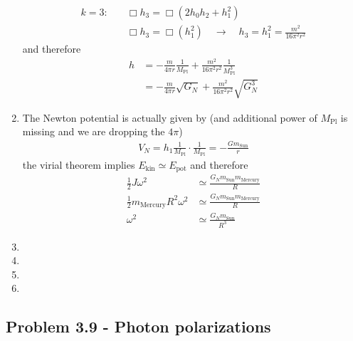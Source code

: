 \documentclass[10pt,a4paper]{book}
\theoremstyle{definition}
\begin{document}
\begin{enumerate}[label=(\alph*)]
\begin{align}
k=3:&\quad\Box h_3=\Box(2h_0h_2+h_1^2)\\
    &\quad\Box h_3=\Box(h_1^2)\quad\rightarrow\quad h_3=h_1^2=\frac{m^2}{16\pi^2r^2}
\end{align}
and therefore
\begin{align}
h&=-\frac{m}{4\pi r}\frac{1}{M_\text{Pl}}+\frac{m^2}{16\pi^2r^2}\frac{1}{M_\text{Pl}^3}\\
&=-\frac{m}{4\pi r}\sqrt{G_N}+\frac{m^2}{16\pi^2r^2}\sqrt{G_N^3}
\end{align}
\item 
The Newton potential is actually given by (and additional power of $M_\text{Pl}$ is missing and we are dropping the $4\pi$)
\begin{align}
V_N=h_1\frac{1}{M_\text{Pl}}\cdot\frac{1}{M_\text{Pl}}=-\frac{Gm_\text{Sun}}{r}
\end{align}
the virial theorem implies $E_\text{kin}\simeq E_\text{pot}$ and therefore
\begin{align}
\frac{1}{2}J\omega^2&\simeq \frac{G_N m_\text{Sun} m_\text{Mercury}}{R}\\
\frac{1}{2}m_\text{Mercury}R^2\omega^2&\simeq \frac{G_N m_\text{Sun} m_\text{Mercury}}{R}\\
\omega^2&\simeq\frac{G_Nm_\text{Sun}}{R^3}
\end{align}

\item 
\item 
\item 
\item 
\end{enumerate}

\subsection{Problem 3.9 - Photon polarizations}
\end{document}
